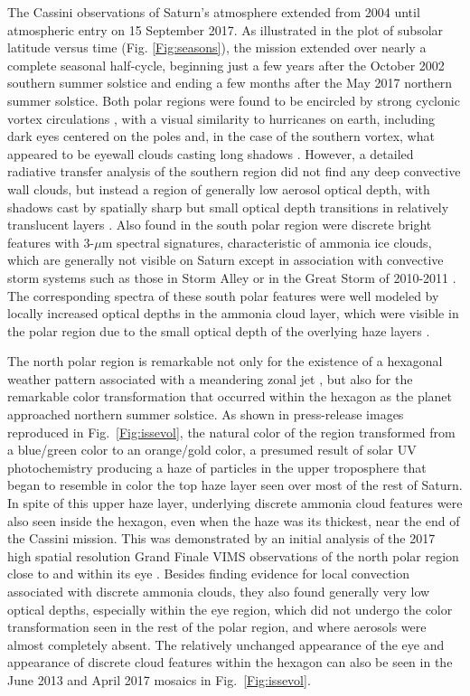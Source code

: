 \documentclass[article,11pt]{emulateapj}
\def\mum{$\mu$m }
\begin{document}
The Cassini observations of Saturn's atmosphere extended from 2004
until atmospheric entry  on 15 September 2017.
As illustrated in the plot of subsolar latitude versus time
(Fig. \ref{Fig:seasons}), the mission extended over nearly a complete
seasonal half-cycle, beginning just a few years after the October 2002
 southern summer solstice and ending a few months after the May 2017
northern summer solstice. Both polar regions were found to be
encircled by strong cyclonic vortex circulations
\citep{Orton2005Sci,Fletcher2008,Baines2009cyclone,Antunano2015,Sayanagi2017,
Antunano2018,Fletcher2018NatCo,Achterberg2018}, with a visual
similarity to hurricanes on earth, including dark eyes
 centered on the poles and, in the case of the southern
vortex, what appeared to be eyewall clouds casting long shadows
\citep{Dyudina2008Sci,Dyudina2009}.  However, a detailed radiative
transfer analysis of the southern region did not find any deep
convective wall clouds, but instead a region of generally low aerosol optical
depth, with shadows cast by spatially sharp but small optical depth
transitions in relatively translucent layers
\citep{Sro2020spole,Sro2020shadows}.  Also found in the south polar
region were discrete bright features with 3-\mum spectral signatures,
characteristic of ammonia ice clouds, which are generally not visible
on Saturn except in association with convective storm systems such as
those in Storm Alley \citep{Baines2009stormclouds,Sro2018dark} or in
the Great Storm of 2010-2011 \citep{Sro2013gws}.  The corresponding
spectra of these south polar features were well modeled by locally
increased optical depths in the ammonia cloud layer, which were
visible in the polar region due to the small optical depth of the
overlying haze layers \citep{Sro2020spole}.

The north polar region is remarkable not only for the existence of a
hexagonal weather pattern associated with a meandering zonal jet
\citep{Sayanagi2019book}, but also for the remarkable color
transformation that occurred within the hexagon as the planet
approached northern summer solstice. As shown in press-release images
reproduced in Fig.\ \ref{Fig:issevol}, the natural color of the region
transformed from a blue/green color to an orange/gold color, a
presumed result of solar UV photochemistry producing a haze of
particles in the upper troposphere that began to resemble in color the
top haze layer seen over most of the rest of Saturn. In spite of this
upper haze layer, underlying discrete ammonia cloud features were also
seen inside the hexagon, even when the haze was its thickest, near the
end of the Cassini mission. This was demonstrated by an initial
analysis of the 2017 high spatial resolution Grand Finale VIMS
observations of the north polar region close to and within its eye
\citep{Baines2018GeoRL}. Besides finding evidence for local convection
associated with discrete ammonia clouds, they also found generally
very low optical depths, especially within the eye region, which did
not undergo the color transformation seen in the rest of the polar
region, and where aerosols were almost completely absent.  The
relatively unchanged appearance of the eye and appearance of discrete
cloud features within the hexagon can also be seen in the June 2013
and April 2017 mosaics in Fig.\ \ref{Fig:issevol}.
\end{document}
